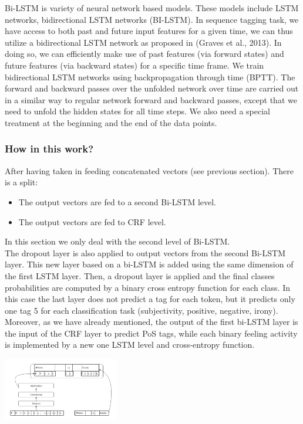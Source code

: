 \documentclass[twocolumn,10pt]{wmrDoc}
\begin{document}
Bi-LSTM is variety of neural network based models. These models include LSTM networks, bidirectional
LSTM networks (BI-LSTM). In sequence tagging task, we have access to both past and future input features for a given time, we can thus utilize a bidirectional LSTM network as proposed in \cite{DBLP:journals/corr/Graves13}(Graves et al., 2013). 
In doing so, we can efficiently make use of past features (via forward states) and future features (via backward states) for a specific time frame. We train bidirectional LSTM networks using backpropagation
through time (BPTT).
The forward and backward passes over the unfolded network over time are carried out in a similar
way to regular network forward and backward passes, except that we need to unfold the hidden states for all time steps. We also need a special treatment at the beginning and the end of the data points.
\subsubsection{How in this work?}
After having taken in feeding concatenated vectors (see previous section).
There is a split:
\begin{itemize}
\item The output vectors are fed to a second Bi-LSTM level. 
\item The output vectors are fed to CRF level.
\end{itemize}
In this section we only deal with the second level of Bi-LSTM.\\
The dropout layer is also applied to output vectors from the second Bi-LSTM layer. 
This new layer based on a bi-LSTM is added using the same dimension of the first LSTM layer.
Then, a dropout layer is applied and the final classes probabilities are computed by a binary
cross entropy function for each class.
In this case the last layer does not predict a tag for each token, but it predicts only one tag 5 for each classification task (subjectivity, positive, negative, irony). 
Moreover, as we have already mentioned, the output of the first bi-LSTM layer is the input of the CRF layer to predict PoS tags, while each binary feeling activity is implemented by a new one
LSTM level and cross-entropy function.

\vskip 0.5cm
\includegraphics[width=0.38\textwidth]{figure/2.png}
\vskip 1.5cm
\end{document}
